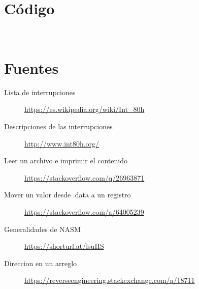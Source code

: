 \documentclass[12pt]{article}
\begin{document}
\section*{Código}
\label{sec:org49f55d7}
\\ 

\section*{Fuentes}
\label{sec:orgb2dad22}
\begin{description}
\item[{Lista de interrupciones}] \url{https://es.wikipedia.org/wiki/Int\_80h}
\item[{Descripciones de las interrupciones}] \url{http://www.int80h.org/}
\item[{Leer un archivo e imprimir el contenido}] \url{https://stackoverflow.com/q/26963871}
\item[{Mover un valor desde .data a un registro}] \url{https://stackoverflow.com/a/64005239}
\item[{Generalidades de NASM}] \url{https://shorturl.at/lsuHS}
\item[{Direccion en un arreglo}] \url{https://reverseengineering.stackexchange.com/a/18711}
\end{description}
\end{document}
